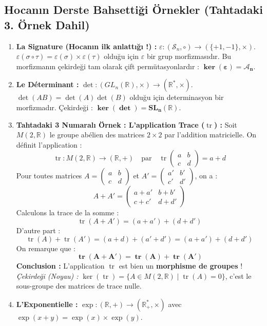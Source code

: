 \documentclass[12pt,a4paper]{report}
\begin{document}
\vspace{0.4cm}

\subsection*{Hocanın Derste Bahsettiği Örnekler (Tahtadaki 3. Örnek Dahil)}
\begin{enumerate}
    \item \textbf{La Signature (Hocanın ilk anlattığı !) :}  
    $\varepsilon : (\mathcal{S}_n, \circ) \longrightarrow (\{+1, -1\}, \times)$.  
    $\varepsilon(\sigma \circ \tau) = \varepsilon(\sigma) \times \varepsilon(\tau)$ olduğu için $\varepsilon$ bir grup morfizmasıdır.  
    Bu morfizmanın çekirdeği tam olarak çift permütasyonlardır : $\mathbf{\ker(\varepsilon) = \mathcal{A}_n}$.
    
    \item \textbf{Le Déterminant :}  
    $\det : (GL_n(\mathbb{R}), \times) \longrightarrow (\mathbb{R}^*, \times)$.  
    $\det(AB) = \det(A)\det(B)$ olduğu için determinasyon bir morfizmadır. Çekirdeği : $\mathbf{\ker(\det) = SL_n(\mathbb{R})}$.
    
    \item \textbf{Tahtadaki 3 Numaralı Örnek : L'application Trace ($\operatorname{tr}$) :}  
    Soit $M(2, \mathbb{R})$ le groupe abélien des matrices $2 \times 2$ par l'addition matricielle.  
    On définit l'application :
    \[ \operatorname{tr} : M(2, \mathbb{R}) \longrightarrow (\mathbb{R}, +) \quad \text{par} \quad \operatorname{tr}\begin{pmatrix} a & b \\ c & d \end{pmatrix} = a + d \]
    Pour toutes matrices $A = \begin{pmatrix} a & b \\ c & d \end{pmatrix}$ et $A' = \begin{pmatrix} a' & b' \\ c' & d' \end{pmatrix}$, on a :
    \[ A + A' = \begin{pmatrix} a+a' & b+b' \\ c+c' & d+d' \end{pmatrix} \]
    Calculons la trace de la somme :
    \[ \operatorname{tr}(A + A') = (a + a') + (d + d') \]
    D'autre part :
    \[ \operatorname{tr}(A) + \operatorname{tr}(A') = (a + d) + (a' + d') = (a + a') + (d + d') \]
    On remarque que :
    \[ \mathbf{\operatorname{tr}(A + A') = \operatorname{tr}(A) + \operatorname{tr}(A')} \]
    \textbf{Conclusion :} L'application $\operatorname{tr}$ est bien un \textbf{morphisme de groupes} !  
    \textit{Çekirdeği (Noyau) :} $\ker(\operatorname{tr}) = \{ A \in M(2, \mathbb{R}) \mid \operatorname{tr}(A) = 0 \}$, c'est le sous-groupe des matrices de trace nulle.
    
    \item \textbf{L'Exponentielle :}  
    $\exp : (\mathbb{R}, +) \longrightarrow (\mathbb{R}_+^*, \times)$ avec $\exp(x + y) = \exp(x) \times \exp(y)$.
\end{enumerate}
\end{document}
